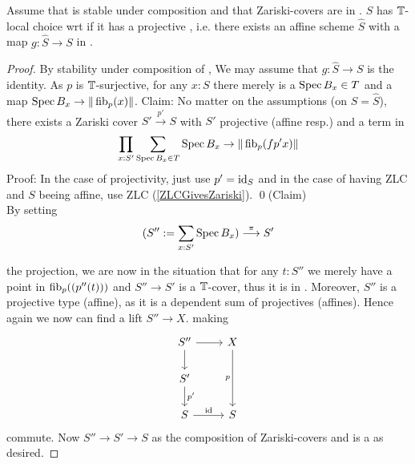 \begin{prop}{\label{prop:LocalChoice}}
	Assume that \Cov is stable under composition and that Zariski-covers are in \Cov.
	$S$ has  $\mathbb{T}$-local choice wrt \Cov if it has a projective \Cover, i.e. there exists an affine scheme $\hat{S}$ with a map $g : \hat{S} \to S$ in \Cov. %
\end{prop}
\begin{proof}
	By stability under composition of \Cov, We may assume that $g : \hat{S} \to S$ is the identity.
	As $p$ is $\mathbb{T}$-surjective, for any $x : S$ there merely is a $\operatorname{Spec} B_x \in T$  and a map $\operatorname{Spec} B_x \to \| \operatorname{fib}_p (x) \| $. 
	Claim: No matter on the assumptions (on $S = \hat{S}$), there exists a Zariski cover $S' \overset{p'}{\to} S$ with $S'$ projective (affine resp.) and a term in
	\[\prod_{x : S'} \sum_{\operatorname{Spec} B_x \in T} \operatorname{Spec} B_x \to \| \operatorname{fib}_p (fp' x)\| \]
	Proof: In the case of projectivity, just use $p' = \operatorname{id}_S$ and in the case of having ZLC and $S$ beeing affine, use ZLC (\ref{ZLCGivesZariski}). \qed(Claim)\\    
	By setting 
	\[(S'' := \sum_{x : S'} \operatorname{Spec} B_x) \overset{\pi}{\longrightarrow} S' \]
	
	the projection, we are now in the situation that for any $t : S''$ we merely have a point in $\operatorname{fib}_p((p''(t)))$ and $S'' \to S'$ is a $\mathbb{T}$-cover, thus it is in \Cov. Moreover, $S''$ is a projective type (affine), as it is a dependent sum of projectives (affines). Hence again we now can find a lift $S'' \to X$. %
	making
	\[\begin{tikzcd}
		{S''} & X \\
		{S'} \\
		S & S
		\arrow[from=1-1, to=1-2]
		\arrow[from=1-1, to=2-1]
		\arrow["p"', from=1-2, to=3-2]
		\arrow["{p'}", from=2-1, to=3-1]
		\arrow["\id", from=3-1, to=3-2]
	\end{tikzcd}\]
	commute. Now $S'' \to S' \to S$ as the composition of Zariski-covers and \Cover is a \Cover \details as desired.
\end{proof}
